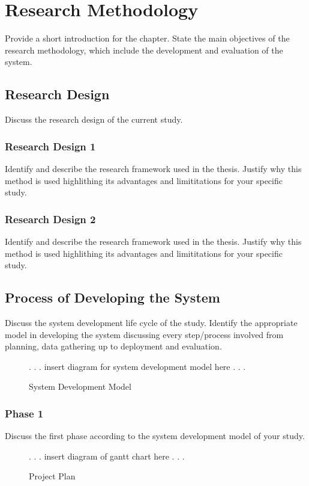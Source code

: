 \chapter{Research Methodology}

Provide a short introduction for the chapter. State the main objectives of the research methodology, which include the development and evaluation of the system.

\section{Research Design}
Discuss the research design of the current study.


\subsection{Research Design 1}
Identify and describe the research framework used in the thesis. Justify why this method is used highlithing its advantages and limititations for your specific study. 

\subsection{Research Design 2}
Identify and describe the research framework used in the thesis. Justify why this method is used highlithing its advantages and limititations for your specific study. 

\section{Process of Developing the System}
Discuss the system development life cycle of the study. Identify the appropriate model in developing the system discussing every step/process involved from planning, data gathering up to deployment and evaluation.

\begin{figure}[h]
	\centering
	\caption{System Development Model}
	\label{fig:system-dev-model}
	. . . insert diagram for system development model here . . .
\end{figure}

\subsection{Phase 1}
Discuss the first phase according to the system development model of your study.

\begin{figure}[h]
	\centering
	\caption{Project Plan}
	\label{fig:gantt-chart}
	. . . insert diagram of gantt chart here . . .
\end{figure}

